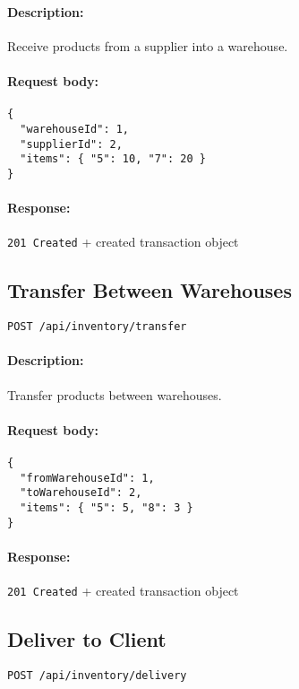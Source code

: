 \documentclass[a4paper,11pt]{article}
\begin{document}
\paragraph{Description:} Receive products from a supplier into a warehouse.
\paragraph{Request body:}
\begin{verbatim}
{
  "warehouseId": 1,
  "supplierId": 2,
  "items": { "5": 10, "7": 20 }
}
\end{verbatim}
\paragraph{Response:} \texttt{201 Created} + created transaction object

\subsection{Transfer Between Warehouses}
\label{sec:inventory-transfer}
\begin{verbatim}
POST /api/inventory/transfer
\end{verbatim}
\paragraph{Description:} Transfer products between warehouses.
\paragraph{Request body:}
\begin{verbatim}
{
  "fromWarehouseId": 1,
  "toWarehouseId": 2,
  "items": { "5": 5, "8": 3 }
}
\end{verbatim}
\paragraph{Response:} \texttt{201 Created} + created transaction object

\subsection{Deliver to Client}
\label{sec:inventory-deliver}
\begin{verbatim}
POST /api/inventory/delivery
\end{verbatim}
\end{document}
